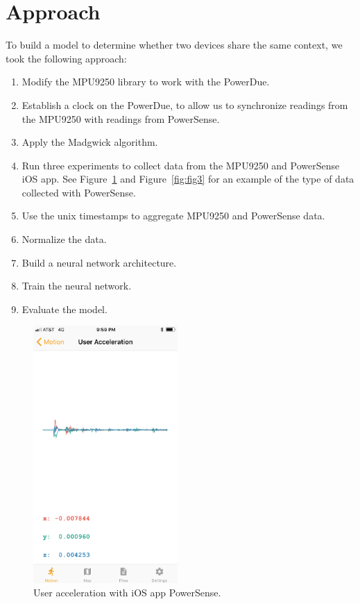 \documentclass[journal]{IEEEtranTIE}
\begin{document}
\section{Approach}

To build a model to determine whether two devices share the same context, we
took the following approach:

\begin{enumerate}
\item Modify the MPU9250 library to work with the PowerDue.
\item Establish a clock on the PowerDue, to allow us to synchronize readings
      from the MPU9250 with readings from PowerSense.
\item Apply the Madgwick algorithm.
\item Run three experiments to collect data from the MPU9250 and PowerSense iOS
      app. See Figure~\ref{fig:fig2} and Figure~\ref{fig:fig3} for an example of
      the type of data collected with PowerSense.
\item Use the unix timestamps to aggregate MPU9250 and PowerSense data.
\item Normalize the data.
\item Build a neural network architecture.
\item Train the neural network.
\item Evaluate the model.
\end{enumerate}

\begin{figure}[!t]\centering
	\includegraphics[width=5.5cm]{acceleration}
	\caption{User acceleration with iOS app PowerSense.}\label{fig:fig2}
\end{figure}
\end{document}
